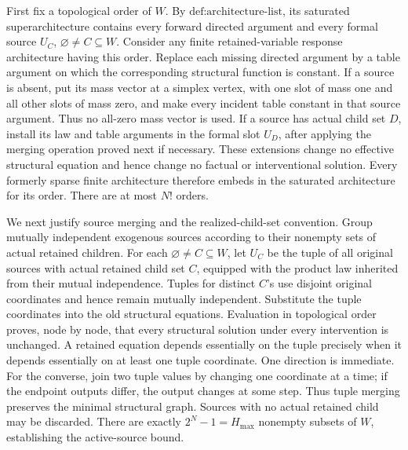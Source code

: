 First fix a topological order of \(W\).  By \(\text{def:architecture-list}\), its saturated superarchitecture contains every forward directed argument and every formal source \(U_C\), \(\varnothing\ne C\subseteq W\).  Consider any finite retained-variable response architecture having this order.  Replace each missing directed argument by a table argument on which the corresponding structural function is constant.  If a source is absent, put its mass vector at a simplex vertex, with one slot of mass one and all other slots of mass zero, and make every incident table constant in that source argument.  Thus no all-zero mass vector is used.  If a source has actual child set \(D\), install its law and table arguments in the formal slot \(U_D\), after applying the merging operation proved next if necessary.  These extensions change no effective structural equation and hence change no factual or interventional solution.  Every formerly sparse finite architecture therefore embeds in the saturated architecture for its order.  There are at most \(N!\) orders.

We next justify source merging and the realized-child-set convention.  Group mutually independent exogenous sources according to their nonempty sets of actual retained children.  For each \(\varnothing\ne C\subseteq W\), let \(U_C\) be the tuple of all original sources with actual retained child set \(C\), equipped with the product law inherited from their mutual independence.  Tuples for distinct \(C\)'s use disjoint original coordinates and hence remain mutually independent.  Substitute the tuple coordinates into the old structural equations.  Evaluation in topological order proves, node by node, that every structural solution under every intervention is unchanged.  A retained equation depends essentially on the tuple precisely when it depends essentially on at least one tuple coordinate.  One direction is immediate.  For the converse, join two tuple values by changing one coordinate at a time; if the endpoint outputs differ, the output changes at some step.  Thus tuple merging preserves the minimal structural graph.  Sources with no actual retained child may be discarded.  There are exactly \(2^N-1=H_{\max}\) nonempty subsets of \(W\), establishing the active-source bound.

